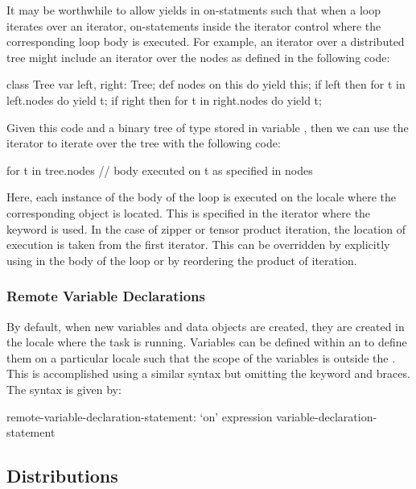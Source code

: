 \begin{openissue}
It may be worthwhile to allow yields in on-statments such that when a
loop iterates over an iterator, on-statements inside the iterator
control where the corresponding loop body is executed.  For example,
an iterator over a distributed tree might include an iterator over the
nodes as defined in the following code:
\begin{chapel}
class Tree {
  var left, right: Tree;
  def nodes {
    on this do yield this;
    if left then
      for t in left.nodes do
        yield t;
    if right then
      for t in right.nodes do
        yield t;
  }
}
\end{chapel}
Given this code and a binary tree of type  stored in
variable , then we can use the  iterator to
iterate over the tree with the following code:
\begin{chapel}
for t in tree.nodes {
  // body executed on t as specified in nodes
}
\end{chapel}
Here, each instance of the body of the  loop is executed
on the locale where the corresponding object  is located.
This is specified in the  iterator where the 
keyword is used.  In the case of zipper or tensor product iteration,
the location of execution is taken from the first iterator.  This can
be overridden by explicitly using  in the body of the loop or
by reordering the product of iteration.
\end{openissue}

\subsubsection{Remote Variable Declarations}
\label{remote_variable_declarations}

By default, when new variables and data objects are created, they are
created in the locale where the task is running.  Variables can be
defined within an  to define them on a particular
locale such that the scope of the variables is outside
the .  This is accomplished using a similar syntax
but omitting the  keyword and braces.  The syntax is given
by:
\begin{syntax}
remote-variable-declaration-statement:
  `on' expression variable-declaration-statement
\end{syntax}

\subsection{Distributions}
\label{Distributions}

